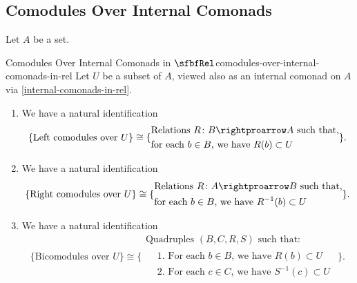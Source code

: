 \subsection{Comodules Over Internal Comonads}\label{subsection-comodules-over-internal-comonads-in-rel}
Let $A$ be a set.
\begin{proposition}{Comodules Over Internal Comonads in $\sfbfRel$}{comodules-over-internal-comonads-in-rel}%
    Let $U$ be a subset of $A$, viewed also as an internal comonad on $A$ via \cref{internal-comonads-in-rel}.
    \begin{enumerate}
        \item\label{comodules-over-internal-comonads-in-rel-left-comodules}We have a natural identification%
            \[
                \{\text{Left comodules over $U$}\}%
                \cong
                \{%
                    \begin{aligned}
                        &\text{Relations $R\colon B\rightproarrow A$ such that,}\\
                        &\text{for each $b\in B$, we have $R(b)\subset U$}
                    \end{aligned}
                \}.%
            \]%
        \item\label{comodules-over-internal-comonads-in-rel-right-comodules}We have a natural identification%
            \[
                \{\text{Right comodules over $U$}\}%
                \cong
                \{%
                    \begin{aligned}
                        &\text{Relations $R\colon A\rightproarrow B$ such that,}\\%
                        &\text{for each $b\in B$, we have $R^{-1}(b)\subset U$}%
                    \end{aligned}
                \}.%
            \]%
        \item\label{comodules-over-internal-comonads-in-rel-bicomodules}We have a natural identification
            \[
                \{\text{Bicomodules over $U$}\}%
                \cong
                \{%
                    \begin{gathered}
                        \text{Quadruples $(B,C,R,S)$ such that:}\\%
                        \begin{aligned}
                            &\text{1. For each $b\in B$, we have $R(b)\subset U$}\\
                            &\text{2. For each $c\in C$, we have $S^{-1}(c)\subset U$}
                        \end{aligned}
                    \end{gathered}
                \}.%
            \]%
    \end{enumerate}
\end{proposition}
